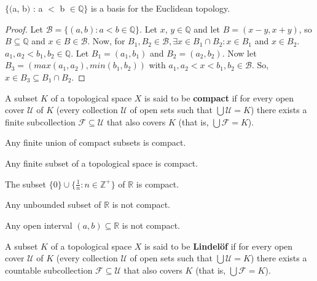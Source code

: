 \documentclass{article}
\begin{document}
	\begin{theorem}
	$\lbrace($a, b$)$ : a $<$ b $\in \mathbb{Q}\rbrace$ is a basis for the Euclidean topology.
	\end{theorem}
	\begin{proof}
	Let $\mathcal{B} = \lbrace (a, b) : a<b \in \mathbb{Q}\rbrace$. Let $x$, $y \in \mathbb{Q}$ and let $B = (x-y, x+y)$, so $B \subseteq \mathbb{Q}$ and $x \in B \in \mathcal{B}$. Now, for $B_1, B_2 \in \mathcal{B}, \exists x \in B_1 \cap B_2 : x \in B_1$ and $x \in B_2$. $a_1, a_2 < b_1, b_2 \in \mathbb{Q}.$ Let $B_1 = (a_1, b_1)$ and $B_2 = (a_2, b_2)$. Now let $B_3 = (max(a_1,a_2), min(b_1,b_2))$ with $a_1,a_2<x<b_1,b_2 \in \mathcal{B}$. So, $x \in B_3 \subseteq B_1 \cap B_2$.
	\end{proof}

	\begin{definition}
	  A subset \(K\) of a topological space \(X\) is said to be \textbf{compact} if for every
	  open cover \(\mathcal U\) of \(K\) (every collection \(\mathcal U\) of open sets
	  such that \(\bigcup \mathcal U=K\)) there exists a finite subcollection
	  \(\mathcal F\subseteq \mathcal U\) that also covers \(K\) (that is,
	  \(\bigcup\mathcal F=K\)).
	\end{definition}

	\begin{theorem}
	  Any finite union of compact subsets is compact.
	\end{theorem}

	\begin{proposition}
	  Any finite subset of a topological space is compact.
	\end{proposition}

	\begin{proposition}
	  The subset \(\{0\}\cup\{\frac{1}{n}:n\in\mathbb Z^+\}\) of \(\mathbb R\) is compact.
	\end{proposition}		

	\begin{proposition}
	  Any unbounded subset of \(\mathbb R\) is not compact.
	\end{proposition}

	\begin{proposition}
	  Any open interval \((a,b)\subseteq\mathbb R\) is not compact.
	\end{proposition}

	\begin{definition}
	  A subset \(K\) of a topological space \(X\) is said to be \textbf{Lindel\"of} if for every
	  open cover \(\mathcal U\) of \(K\) (every collection \(\mathcal U\) of open sets
	  such that \(\bigcup \mathcal U=K\)) there exists a countable subcollection
	  \(\mathcal F\subseteq \mathcal U\) that also covers \(K\) (that is,
	  \(\bigcup\mathcal F=K\)).
	\end{definition}
\end{document}
